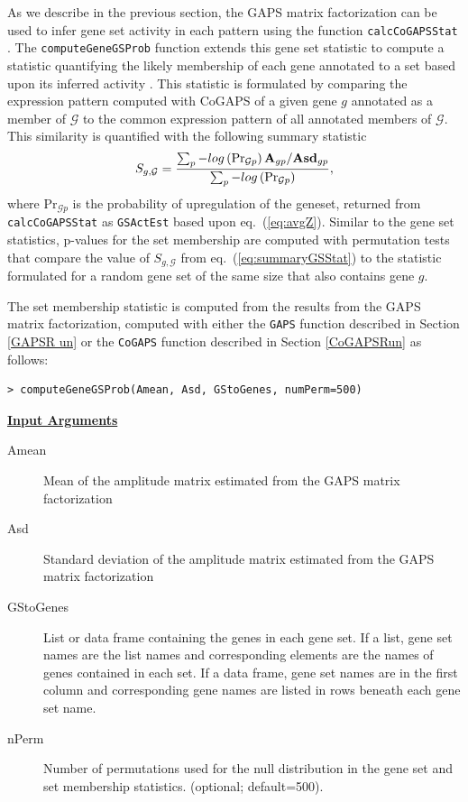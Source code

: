 \documentclass{report}
\begin{document}
\par As we describe in the previous section, the GAPS matrix factorization can be used to infer gene set activity in each pattern using the function \texttt{calcCoGAPSStat} \cite{Ochs2009}.  The \texttt{computeGeneGSProb} function extends this gene set statistic to compute a statistic quantifying the likely membership of each gene annotated to a set based upon its inferred activity \cite{Fertig2012}.  This statistic is formulated by comparing the expression pattern computed with CoGAPS of a given gene $g$ annotated as a member of $\mathcal{G}$ to the common expression pattern of all annotated members of $\mathcal{G}$.  This similarity is quantified with the following summary statistic
\begin{equation}
S_{g,\mathcal{G}} = \frac{\sum_{p} -log\left(\mbox{Pr}_{\mathcal{G}p}\right){\bf{A}}_{gp}/{\bf{Asd}}_{gp}}{\sum_{p} -log\left(\mbox{Pr}_{\mathcal{G}p}\right)},
\label{eq:summaryGSStat}
\end{equation}
where $\mbox{Pr}_{\mathcal{G}p}$ is the probability of upregulation of the geneset, returned from \texttt{calcCoGAPSStat} as \texttt{GSActEst} based upon eq.~(\ref{eq:avgZ}).  Similar to the gene set statistics, p-values for the set membership are computed with permutation tests that compare the value of $S_{g,\mathcal{G}}$ from eq.~(\ref{eq:summaryGSStat}) to the statistic formulated for a random gene set of the same size that also contains gene $g$.  

\par The set membership statistic is computed from the results from the GAPS matrix factorization, computed with either the \texttt{GAPS} function described in Section \ref{GAPSR un} or the \texttt{CoGAPS} function described in Section \ref{CoGAPSRun} as follows:
\begin{verbatim}
> computeGeneGSProb(Amean, Asd, GStoGenes, numPerm=500)
\end{verbatim}

\par \noindent \textbf{\underline{Input Arguments}}
\begin{description}
\item[Amean]{Mean of the amplitude matrix estimated from the GAPS matrix factorization}
\item[Asd]{Standard deviation of the amplitude matrix estimated from the GAPS matrix factorization}
\item[GStoGenes]{List or data frame containing the genes in each gene set. If a list, gene set names are the list names and corresponding elements are the names of genes contained in each set. If a data frame, gene set names are in the first column and corresponding gene names are listed in rows beneath each gene set name.}
\item[nPerm]{Number of permutations used for the null distribution in the gene set and set membership statistics. (optional; default=500).}
\end{description}
  
\end{document}
